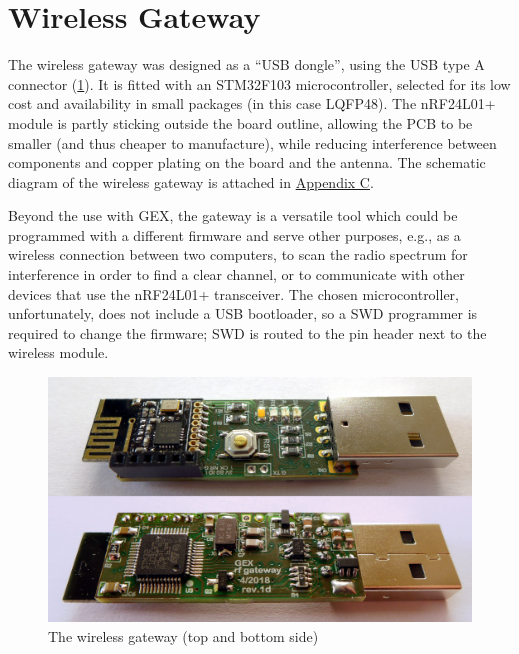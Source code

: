 \section{Wireless Gateway} \label{sec:rfgateway}

The wireless gateway was designed as a ``\gls{USB} dongle'', using the \gls{USB} type A connector (\cref{fig:gwxgw}). It is fitted with an STM32F103 microcontroller, selected for its low cost and availability in small packages (in this case LQFP48). The nRF24L01+ module is partly sticking outside the board outline, allowing the \gls{PCB} to be smaller (and thus cheaper to manufacture), while reducing interference between components and copper plating on the board and the antenna. The schematic diagram of the wireless gateway is attached in \hyperref[apx:gex_wgw]{Appendix C}.

Beyond the use with GEX, the gateway is a versatile tool which could be programmed with a different firmware and serve other purposes, e.g., as a wireless connection between two computers, to scan the radio spectrum for interference in order to find a clear channel, or to communicate with other devices that use the nRF24L01+ transceiver. The chosen microcontroller, unfortunately, does not include a USB bootloader, so a SWD programmer is required to change the firmware; SWD is routed to the pin header next to the wireless module.


\begin{figure}[h]
	\centering
	\includegraphics[width=.9\textwidth]{img/photo-rfdongle.jpg}
	\caption{\label{fig:gwxgw}The wireless gateway (top and bottom side)}
\end{figure}
